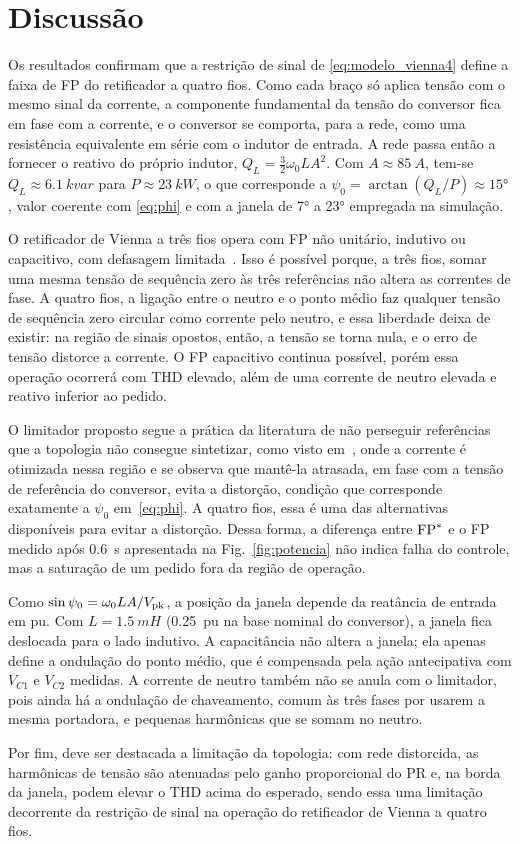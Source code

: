 \section{Discussão}
\label{sec:discussao}
Os resultados confirmam que a restrição de sinal de \eqref{eq:modelo_vienna4} define a faixa de FP do retificador a quatro fios. 
Como cada braço só aplica tensão com o mesmo sinal da corrente, a componente fundamental da tensão do conversor fica em fase com a corrente, e o conversor se comporta, para a rede, como uma resistência equivalente em série com o indutor de entrada. 
A rede passa então a fornecer o reativo do próprio indutor, $Q_L=\tfrac{3}{2}\omega_0LA^2$. Com $A\approx\SI{85}{A}$, tem-se $Q_L\approx\SI{6,1}{kvar}$ para $P\approx\SI{23}{kW}$, o que corresponde a $\psi_0=\arctan(Q_L/P)\approx\ang{15}$, valor coerente com \eqref{eq:phi} e com a janela de \ang{7} a \ang{23} empregada na simulação.

O retificador de Vienna a três fios opera com FP não unitário, indutivo ou capacitivo, com defasagem limitada~\cite{tu2019extreme,kolar2013essence}. 
Isso é possível porque, a três fios, somar uma mesma tensão de sequência zero às três referências não altera as correntes de fase. 
A quatro fios, a ligação entre o neutro e o ponto médio faz qualquer tensão de sequência zero circular como corrente pelo neutro, e essa liberdade deixa de existir: na região de sinais opostos, então, a tensão se torna nula, e o erro de tensão distorce a corrente. O FP capacitivo continua possível, porém essa operação ocorrerá com THD elevado, além de uma corrente de neutro elevada e reativo inferior ao pedido.

O limitador proposto segue a prática da literatura de não perseguir referências que a topologia não consegue sintetizar, como visto em~\cite{liao2026nonunity}, onde a corrente é otimizada nessa região e se observa que mantê-la atrasada, em fase com a tensão de referência do conversor, evita a distorção, condição que corresponde exatamente a $\psi_0$ em~\eqref{eq:phi}. A quatro fios, essa é uma das alternativas disponíveis para evitar a distorção. Dessa forma, a diferença entre $\mathrm{FP}^*$ e o FP medido após \SI{0,6}{s} apresentada na Fig.~\ref{fig:potencia} não indica falha do controle, mas a saturação de um pedido fora da região de operação.

Como $\sin\psi_0=\omega_0LA/V_{\mathrm{pk}}$, a posição da janela depende da reatância de entrada em pu. Com $L=\SI{1,5}{mH}$ (\SI{0,25}{pu} na base nominal do conversor), a janela fica deslocada para o lado indutivo. A capacitância não altera a janela; ela apenas define a ondulação do ponto médio, que é compensada pela ação antecipativa com $V_{C1}$ e $V_{C2}$ medidas. A corrente de neutro também não se anula com o limitador, pois ainda há a ondulação de chaveamento, comum às três fases por usarem a mesma portadora, e pequenas harmônicas que se somam no neutro.

Por fim, deve ser destacada a limitação da topologia: com rede distorcida, as harmônicas de tensão são atenuadas pelo ganho proporcional do PR e, na borda da janela, podem elevar o THD acima do esperado, sendo essa uma
limitação decorrente da restrição de sinal na operação do retificador de Vienna a quatro fios.

